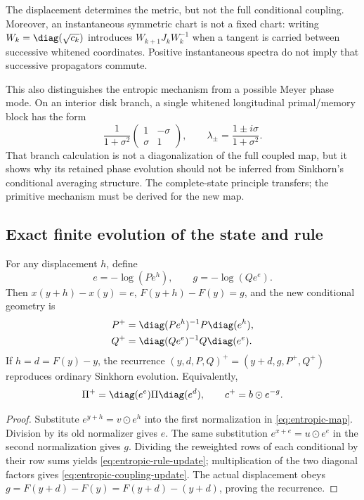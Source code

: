 The displacement determines the metric, but not the full conditional
coupling. Moreover, an instantaneous symmetric chart is not a fixed chart:
writing $W_k=\diag(\sqrt{c_k})$ introduces $W_{k+1}J_kW_k^{-1}$ when a
tangent is carried between successive whitened coordinates. Positive
instantaneous spectra do not imply that successive propagators commute.

This also distinguishes the entropic mechanism from a possible Meyer
phase mode. On an interior disk branch, a single whitened longitudinal
primal/memory block has the form
\[
 \frac{1}{1+\sigma^2}
 \begin{pmatrix}1&-\sigma\\\sigma&1\end{pmatrix},
 \qquad \lambda_\pm=\frac{1\pm i\sigma}{1+\sigma^2}.
\]
That branch calculation is not a diagonalization of the full coupled map,
but it shows why its retained phase evolution should not be inferred from
Sinkhorn's conditional averaging structure. The complete-state principle
transfers; the primitive mechanism must be derived for the new map.

\subsection{Exact finite evolution of the state and rule}
\begin{theorem}
\label{thm:entropic-evolution}
For any displacement $h$, define
\begin{equation}
 e=-\log(Pe^h),\qquad g=-\log(Qe^e).
 \label{eq:entropic-increment}
\end{equation}
Then $x(y+h)-x(y)=e$, $F(y+h)-F(y)=g$, and the new conditional geometry is
\begin{align}
 P^+&=\diag(Pe^h)^{-1}P\diag(e^h),\nonumber\\
 Q^+&=\diag(Qe^e)^{-1}Q\diag(e^e).
 \label{eq:entropic-rule-update}
\end{align}
If $h=d=F(y)-y$, the recurrence
$(y,d,P,Q)^+=(y+d,g,P^+,Q^+)$ reproduces ordinary Sinkhorn evolution.
Equivalently,
\begin{equation}
 \Pi^+=\diag(e^e)\Pi\diag(e^d),\qquad
 c^+=b\odot e^{-g}.
 \label{eq:entropic-coupling-update}
\end{equation}
\end{theorem}
\begin{proof}
Substitute $e^{y+h}=v\odot e^h$ into the first normalization in
\eqref{eq:entropic-map}. Division by its old normalizer gives $e$.
The same substitution $e^{x+e}=u\odot e^e$ in the second normalization
gives $g$. Dividing the reweighted rows of each conditional by their row
sums yields \eqref{eq:entropic-rule-update}; multiplication of the two
diagonal factors gives \eqref{eq:entropic-coupling-update}. The actual
displacement obeys $g=F(y+d)-F(y)=F(y+d)-(y+d)$, proving the recurrence.
\end{proof}

